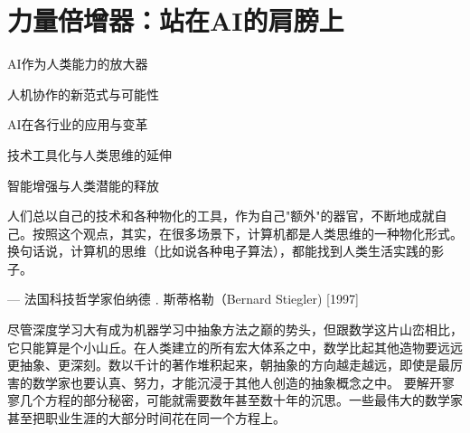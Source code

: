 \chapter{力量倍增器：站在AI的肩膀上}
 \begin{introduction}
  \item AI作为人类能力的放大器
  \item 人机协作的新范式与可能性
  \item AI在各行业的应用与变革
  \item 技术工具化与人类思维的延伸
  \item 智能增强与人类潜能的释放

\end{introduction}
人们总以自己的技术和各种物化的工具，作为自己"额外"的器官，不断地成就自己。按照这个观点，其实，在很多场景下，计算机都是人类思维的一种物化形式。换句话说，计算机的思维（比如说各种电子算法），都能找到人类生活实践的影子。
\begin{flushright}
— 法国科技哲学家伯纳德﹒斯蒂格勒（Bernard Stiegler)  [1997]
\end{flushright}
尽管深度学习大有成为机器学习中抽象方法之巅的势头，但跟数学这片山峦相比，它只能算是个小山丘。在人类建立的所有宏大体系之中，数学比起其他造物要远远更抽象、更深刻。数以千计的著作堆积起来，朝抽象的方向越走越远，即使是最厉害的数学家也要认真、努力，才能沉浸于其他人创造的抽象概念之中。
要解开寥寥几个方程的部分秘密，可能就需要数年甚至数十年的沉思。一些最伟大的数学家甚至把职业生涯的大部分时间花在同一个方程上。

